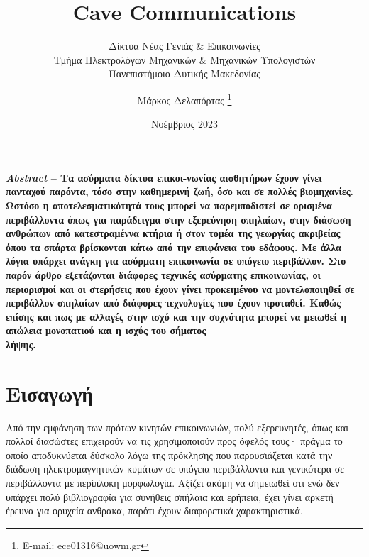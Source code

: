 \documentclass[12pt]{paper}
\title{\textsf{ Cave Communications}}
\subtitle{Δίκτυα Νέας Γενιάς \& Επικοινωνίες\\ Τμήμα Ηλεκτρολόγων Μηχανικών \& Μηχανικών Υπολογιστών \\Πανεπιστήμοιο Δυτικής Μακεδονίας}
\author{\textsf{Μάρκος Δελαπόρτας} \footnote{E-mail: ece01316@uowm.gr}}
\date{Νοέμβριος 2023}
\begin{document}
\maketitle

\begin{multicols*}{2}
    \scriptsize \textbf{ \textit{Abstract} -- Τα ασύρματα δίκτυα επικοι-νωνίας αισθητήρων
        έχουν γίνει πανταχού παρόντα, τόσο στην καθημερινή ζωή, όσο και σε πολλές
        βιομηχανίες. Ωστόσο η αποτελεσματικότητά τους μπορεί να παρεμποδιστεί σε ορισμένα
        περιβάλλοντα όπως για παράδειγμα στην εξερεύνηση σπηλαίων, στην διάσωση ανθρώπων
        από κατεστραμέννα κτήρια ή στον τομέα της γεωργίας ακριβείας όπου τα σπάρτα
        βρίσκονται κάτω από την επιφάνεια του εδάφους. Με άλλα λόγια υπάρχει ανάγκη για
        ασύρματη επικοινωνία σε υπόγειο περιβάλλον. Στο παρόν άρθρο εξετάζονται διάφορες
        τεχνικές ασύρματης επικοινωνίας, οι περιορισμοί και οι στερήσεις που έχουν γίνει
        προκειμένου να μοντελοποιηθεί σε περιβάλλον σπηλαίων από διάφορες τεχνολογίες που
        έχουν προταθεί. Καθώς επίσης και πως με αλλαγές στην ισχύ και την συχνότητα μπορεί
        να μειωθεί η απώλεια μονοπατιού και η ισχύς του σήματος\\
        λήψης. }

    \section{\normalsize \textsf{Εισαγωγή}}
        Από την εμφάνηση των πρότων κινητών επικοινωνιών, πολύ εξερευνητές, όπως και
        πολλοί διασώστες επιχειρούν να τις χρησιμοποιούν προς όφελός τους· πράγμα το οποίο
        αποδυκνύεται δύσκολο λόγω της πρόκλησης που παρουσιάζεται κατά την διάδωση
        ηλεκτρομαγνητικών κυμάτων σε υπόγεια περιβάλλοντα και γενικότερα σε περιβάλλοντα
        με περίπλοκη μορφωλογία. Αξίζει ακόμη να σημειωθεί οτι ενώ δεν υπάρχει πολύ
        βιβλιογραφία για συνήθεις σπήλαια και ερήπεια, έχει γίνει αρκετή έρευνα για
        ορυχεία ανθρακα, παρότι έχουν διαφορετικά χαρακτηριστικά.
    

\end{multicols*}
\end{document}
